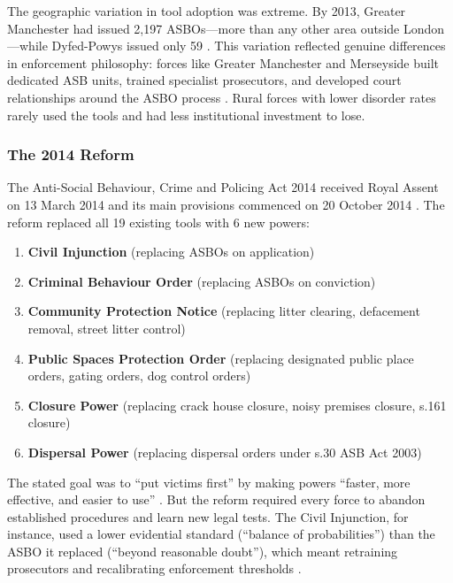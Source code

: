 \documentclass[12pt]{article}
\begin{document}
The geographic variation in tool adoption was extreme. By 2013, Greater Manchester had issued 2,197 ASBOs---more than any other area outside London---while Dyfed-Powys issued only 59 \citep{homeoffice2014}. This variation reflected genuine differences in enforcement philosophy: forces like Greater Manchester and Merseyside built dedicated ASB units, trained specialist prosecutors, and developed court relationships around the ASBO process \citep{solanki2006}. Rural forces with lower disorder rates rarely used the tools and had less institutional investment to lose.

\subsubsection*{The 2014 Reform} The Anti-Social Behaviour, Crime and Policing Act 2014 received Royal Assent on 13 March 2014 and its main provisions commenced on 20 October 2014 \citep{homeoffice2014guide}. The reform replaced all 19 existing tools with 6 new powers:

\begin{enumerate}
  \item \textbf{Civil Injunction} (replacing ASBOs on application)
  \item \textbf{Criminal Behaviour Order} (replacing ASBOs on conviction)
  \item \textbf{Community Protection Notice} (replacing litter clearing, defacement removal, street litter control)
  \item \textbf{Public Spaces Protection Order} (replacing designated public place orders, gating orders, dog control orders)
  \item \textbf{Closure Power} (replacing crack house closure, noisy premises closure, s.161 closure)
  \item \textbf{Dispersal Power} (replacing dispersal orders under s.30 ASB Act 2003)
\end{enumerate}

The stated goal was to ``put victims first'' by making powers ``faster, more effective, and easier to use'' \citep{homeoffice2014guide}. But the reform required every force to abandon established procedures and learn new legal tests. The Civil Injunction, for instance, used a lower evidential standard (``balance of probabilities'') than the ASBO it replaced (``beyond reasonable doubt''), which meant retraining prosecutors and recalibrating enforcement thresholds \citep{mceachern2018}.
\end{document}
